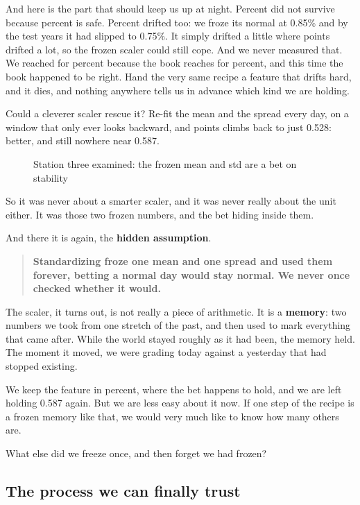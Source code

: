 \documentclass[11pt]{article} %
\begin{document}
And here is the part that should keep us up at night. Percent did not survive because percent is safe. Percent drifted too: we froze its normal at 0.85\% and by the test years it had slipped to 0.75\%. It simply drifted a little where points drifted a lot, so the frozen scaler could still cope. And we never measured that. We reached for percent because the book reaches for percent, and this time the book happened to be right. Hand the very same recipe a feature that drifts hard, and it dies, and nothing anywhere tells us in advance which kind we are holding.

Could a cleverer scaler rescue it? Re-fit the mean and the spread every day, on a window that only ever looks backward, and points climbs back to just 0.528: better, and still nowhere near 0.587.

\begin{figure}[htbp]
\centering

\caption{Station three examined: the frozen mean and std are a bet on stability}
\end{figure}


So it was never about a smarter scaler, and it was never really about the unit either. It was those two frozen numbers, and the bet hiding inside them.

And there it is again, the \textbf{hidden assumption}.


\begin{quote}
\textbf{Standardizing froze one mean and one spread and used them forever, betting a normal day would stay normal. We never once checked whether it would.}
\end{quote}


The scaler, it turns out, is not really a piece of arithmetic. It is a \textbf{memory}: two numbers we took from one stretch of the past, and then used to mark everything that came after. While the world stayed roughly as it had been, the memory held. The moment it moved, we were grading today against a yesterday that had stopped existing.

We keep the feature in percent, where the bet happens to hold, and we are left holding 0.587 again. But we are less easy about it now. If one step of the recipe is a frozen memory like that, we would very much like to know how many others are.

What else did we freeze once, and then forget we had frozen?


\subsection{The process we can finally trust}
\end{document}
